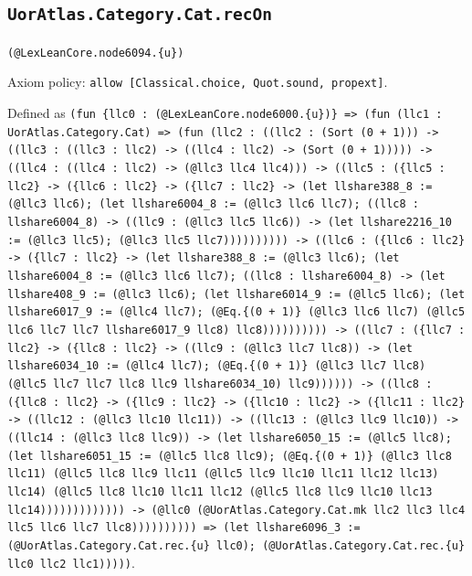 \documentclass[11pt]{article}
\begin{document}
\subsection*{\texttt{UorAtlas.Category.Cat.recOn}}
\noindent\texttt{(@LexLeanCore.node6094.\{u\})}\par
\noindent Axiom policy: \texttt{allow [Classical.choice, Quot.sound, propext]}.\par
\noindent Defined as \texttt{(fun \{llc0 : (@LexLeanCore.node6000.\{u\})\} => (fun (llc1 : UorAtlas.Category.Cat) => (fun (llc2 : ((llc2 : (Sort (0 + 1))) -> ((llc3 : ((llc3 : llc2) -> ((llc4 : llc2) -> (Sort (0 + 1))))) -> ((llc4 : ((llc4 : llc2) -> (@llc3 llc4 llc4))) -> ((llc5 : (\{llc5 : llc2\} -> (\{llc6 : llc2\} -> (\{llc7 : llc2\} -> (let llshare388\_8 := (@llc3 llc6); (let llshare6004\_8 := (@llc3 llc6 llc7); ((llc8 : llshare6004\_8) -> ((llc9 : (@llc3 llc5 llc6)) -> (let llshare2216\_10 := (@llc3 llc5); (@llc3 llc5 llc7)))))))))) -> ((llc6 : (\{llc6 : llc2\} -> (\{llc7 : llc2\} -> (let llshare388\_8 := (@llc3 llc6); (let llshare6004\_8 := (@llc3 llc6 llc7); ((llc8 : llshare6004\_8) -> (let llshare408\_9 := (@llc3 llc6); (let llshare6014\_9 := (@llc5 llc6); (let llshare6017\_9 := (@llc4 llc7); (@Eq.\{(0 + 1)\} (@llc3 llc6 llc7) (@llc5 llc6 llc7 llc7 llshare6017\_9 llc8) llc8)))))))))) -> ((llc7 : (\{llc7 : llc2\} -> (\{llc8 : llc2\} -> ((llc9 : (@llc3 llc7 llc8)) -> (let llshare6034\_10 := (@llc4 llc7); (@Eq.\{(0 + 1)\} (@llc3 llc7 llc8) (@llc5 llc7 llc7 llc8 llc9 llshare6034\_10) llc9)))))) -> ((llc8 : (\{llc8 : llc2\} -> (\{llc9 : llc2\} -> (\{llc10 : llc2\} -> (\{llc11 : llc2\} -> ((llc12 : (@llc3 llc10 llc11)) -> ((llc13 : (@llc3 llc9 llc10)) -> ((llc14 : (@llc3 llc8 llc9)) -> (let llshare6050\_15 := (@llc5 llc8); (let llshare6051\_15 := (@llc5 llc8 llc9); (@Eq.\{(0 + 1)\} (@llc3 llc8 llc11) (@llc5 llc8 llc9 llc11 (@llc5 llc9 llc10 llc11 llc12 llc13) llc14) (@llc5 llc8 llc10 llc11 llc12 (@llc5 llc8 llc9 llc10 llc13 llc14))))))))))))) -> (@llc0 (@UorAtlas.Category.Cat.mk llc2 llc3 llc4 llc5 llc6 llc7 llc8)))))))))) => (let llshare6096\_3 := (@UorAtlas.Category.Cat.rec.\{u\} llc0); (@UorAtlas.Category.Cat.rec.\{u\} llc0 llc2 llc1)))))}.\par
\end{document}

